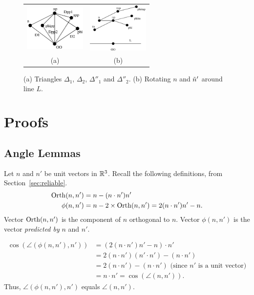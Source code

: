
\newtheorem*{propAngle}{Proposition \ref{prop:angle}}
\newtheorem*{propAngle:b}{Proposition \ref{prop:angle:b}}
\newtheorem*{propIV}{Proposition \ref{prop:IV}}
\newtheorem*{propkappa}{Proposition \ref{prop:kappa}}
\newtheorem*{propIVb}{Proposition \ref{prop:IV:b}}


\begin{figure}[t]
\begin{center}
\begin{tabular}{cc}
\includegraphics[width=1.2in]{images/phiTriangles.eps} \quad &
\quad
\includegraphics[width=1.2in]{images/phiDiff2.eps} \\
(a) & (b)
\end{tabular}
\end{center}
\caption{
(a) Triangles $\Delta_1$, $\Delta_2$, $\Delta''_1$ and $\Delta''_2$.
(b) Rotating $n$ and $\tilde{n}'$ around line $L$.}
\label{fig:triangles}
\end{figure}

\section{Proofs}

\subsection{Angle Lemmas}

Let $n$ and $n'$ be unit vectors in $\mathbb{R}^{3}$.
Recall the following definitions, from Section~\ref{sec:reliable}.
\begin{align*}
\mathrm{Orth}(n,n') & = n - (n \cdot n') n' \\ 
\phi(n,n') & = n - 2 \times \mathrm{Orth}(n,n') = 2(n \cdot n') n' - n.
\end{align*}
Vector $\mathrm{Orth}(n,n')$ is the component of $n$ orthogonal to $n$.
Vector $\phi(n,n')$ is the vector 
{\em predicted by} $n$ and $n'$.

\begin{align*}
\cos(\angle(\phi(n,n'),n')) & = (2 (n \cdot n') n' -n) \cdot n' \\
  & = 2 (n \cdot n') (n' \cdot n') - (n \cdot n') \\
  & = 2 (n \cdot n') - (n \cdot n') \mbox{  (since $n'$ is a unit vector)} \\
  & = n \cdot n' = \cos(\angle(n,n')).
\end{align*}
Thus, $\angle(\phi(n,n'),n')$ equals $\angle(n,n')$.

